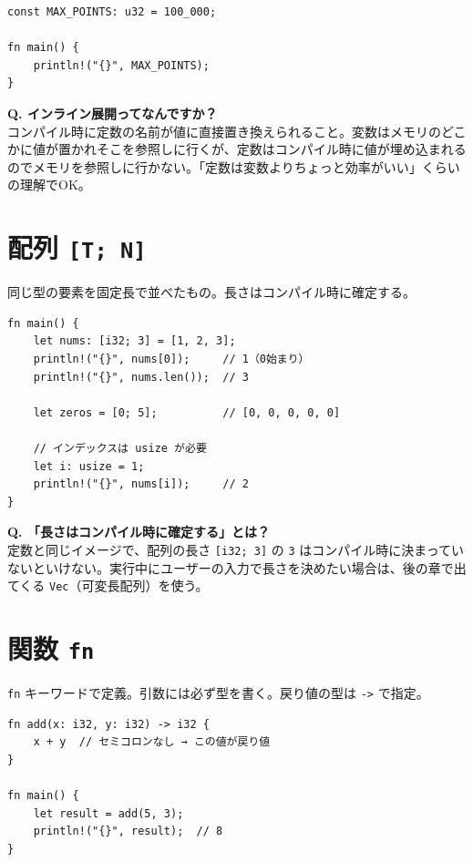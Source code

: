 \documentclass[12pt,a4paper]{article}
\begin{document}
\begin{lstlisting}
const MAX_POINTS: u32 = 100_000;

fn main() {
    println!("{}", MAX_POINTS);
}
\end{lstlisting}

\begin{qabox}
\textbf{Q. インライン展開ってなんですか？}\\
コンパイル時に定数の名前が値に直接置き換えられること。変数はメモリのどこかに値が置かれそこを参照しに行くが、定数はコンパイル時に値が埋め込まれるのでメモリを参照しに行かない。「定数は変数よりちょっと効率がいい」くらいの理解でOK。
\end{qabox}

\section{配列 \texttt{[T; N]}}

同じ型の要素を固定長で並べたもの。長さはコンパイル時に確定する。

\begin{lstlisting}
fn main() {
    let nums: [i32; 3] = [1, 2, 3];
    println!("{}", nums[0]);     // 1（0始まり）
    println!("{}", nums.len());  // 3

    let zeros = [0; 5];          // [0, 0, 0, 0, 0]

    // インデックスは usize が必要
    let i: usize = 1;
    println!("{}", nums[i]);     // 2
}
\end{lstlisting}

\begin{qabox}
\textbf{Q. 「長さはコンパイル時に確定する」とは？}\\
定数と同じイメージで、配列の長さ \texttt{[i32; 3]} の \texttt{3} はコンパイル時に決まっていないといけない。実行中にユーザーの入力で長さを決めたい場合は、後の章で出てくる \texttt{Vec}（可変長配列）を使う。
\end{qabox}

\section{関数 \texttt{fn}}

\texttt{fn} キーワードで定義。引数には必ず型を書く。戻り値の型は \texttt{->} で指定。

\begin{lstlisting}
fn add(x: i32, y: i32) -> i32 {
    x + y  // セミコロンなし → この値が戻り値
}

fn main() {
    let result = add(5, 3);
    println!("{}", result);  // 8
}
\end{lstlisting}
\end{document}
